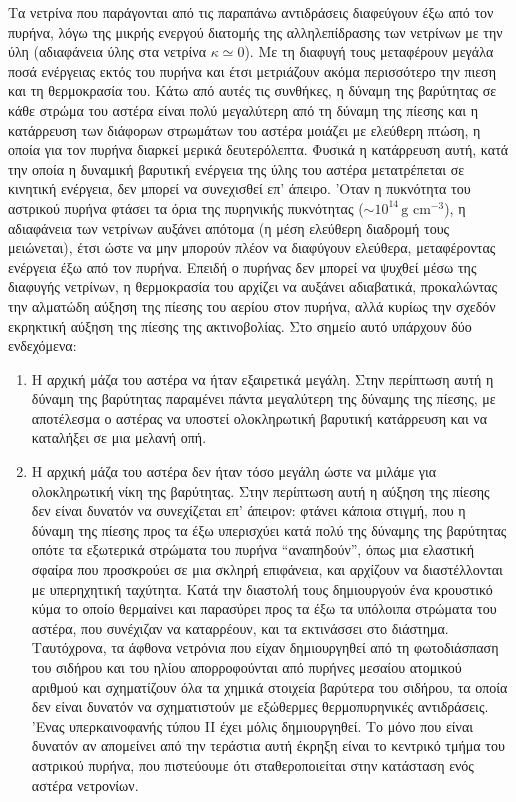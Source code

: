 Τα νετρίνα που παράγονται από τις παραπάνω αντιδράσεις διαφεύγουν έξω από τον πυρήνα, λόγω της μικρής ενεργού διατομής της αλληλεπίδρασης των νετρίνων με την ύλη (αδιαφάνεια ύλης στα νετρίνα $\kappa \simeq 0$). Με τη διαφυγή τους μεταφέρουν μεγάλα ποσά ενέργειας εκτός του πυρήνα και έτσι μετριάζουν ακόμα περισσότερο την πιεση και τη θερμοκρασία του. Κάτω από αυτές τις συνθήκες, η δύναμη της βαρύτητας σε κάθε στρώμα του αστέρα είναι πολύ μεγαλύτερη από τη δύναμη της πίεσης και η κατάρρευση των διάφορων στρωμάτων του αστέρα μοιάζει με ελεύθερη πτώση, η οποία για τον πυρήνα διαρκεί μερικά δευτερόλεπτα. Φυσικά η κατάρρευση αυτή, κατά την οποία η δυναμική βαρυτική ενέργεια της ύλης του αστέρα μετατρέπεται σε κινητική ενέργεια, δεν μπορεί να συνεχισθεί επ' άπειρο. 'Οταν η πυκνότητα του αστρικού πυρήνα φτάσει τα όρια της πυρηνικής πυκνότητας ($\sim 10^{14}\,\text{g cm$^{-3}$}$), η αδιαφάνεια των νετρίνων αυξάνει απότομα (η μέση ελεύθερη διαδρομή τους μειώνεται), έτσι ώστε να μην μπορούν πλέον να διαφύγουν ελεύθερα, μεταφέροντας ενέργεια έξω από τον πυρήνα. Επειδή ο πυρήνας δεν μπορεί να ψυχθεί μέσω της διαφυγής νετρίνων, η θερμοκρασία του αρχίζει να αυξάνει αδιαβατικά, προκαλώντας την αλματώδη αύξηση της πίεσης του αερίου στον πυρήνα, αλλά κυρίως την σχεδόν εκρηκτική αύξηση της πίεσης της ακτινοβολίας. Στο σημείο αυτό υπάρχουν δύο ενδεχόμενα:
\begin{enumerate}
    \item Η αρχική μάζα του αστέρα να ήταν εξαιρετικά μεγάλη. Στην περίπτωση αυτή η δύναμη της βαρύτητας παραμένει πάντα μεγαλύτερη της δύναμης της πίεσης, με αποτέλεσμα ο αστέρας να υποστεί ολοκληρωτική βαρυτική κατάρρευση και να καταλήξει σε μια μελανή οπή.
    \item Η αρχική μάζα του αστέρα δεν ήταν τόσο μεγάλη ώστε να μιλάμε για ολοκληρωτική νίκη της βαρύτητας. Στην περίπτωση αυτή η αύξηση της πίεσης δεν είναι δυνατόν να συνεχίζεται επ' άπειρον: φτάνει κάποια στιγμή, που η δύναμη της πίεσης προς τα έξω υπερισχύει κατά πολύ της δύναμης της βαρύτητας οπότε τα εξωτερικά στρώματα του πυρήνα ``αναπηδούν'', όπως μια ελαστική σφαίρα που προσκρούει σε μια σκληρή επιφάνεια, και αρχίζουν να διαστέλλονται με υπερηχητική ταχύτητα. Κατά την διαστολή τους δημιουργούν ένα κρουστικό κύμα το οποίο θερμαίνει και παρασύρει προς τα έξω τα υπόλοιπα στρώματα του αστέρα, που συνέχιζαν να καταρρέουν, και τα εκτινάσσει στο διάστημα. Ταυτόχρονα, τα άφθονα νετρόνια που είχαν δημιουργηθεί από τη φωτοδιάσπαση του σιδήρου και του ηλίου απορροφούνται από πυρήνες μεσαίου ατομικού αριθμού και σχηματίζουν όλα τα χημικά στοιχεία βαρύτερα του σιδήρου, τα οποία δεν είναι δυνατόν να σχηματιστούν με εξώθερμες θερμοπυρηνικές αντιδράσεις. 'Ενας υπερκαινοφανής τύπου II έχει μόλις δημιουργηθεί. Το μόνο που είναι δυνατόν αν απομείνει από την τεράστια αυτή έκρηξη είναι το κεντρικό τμήμα του αστρικού πυρήνα, που πιστεύουμε ότι σταθεροποιείται στην κατάσταση ενός αστέρα νετρονίων.
\end{enumerate}
